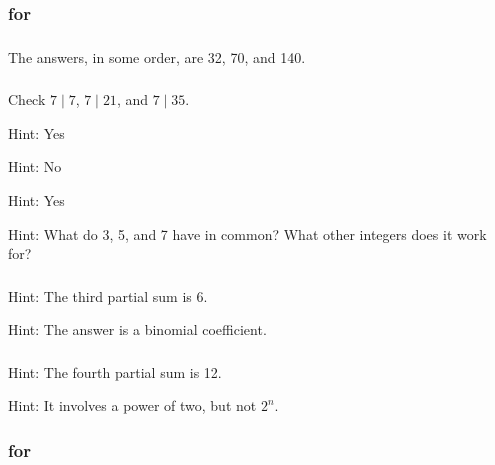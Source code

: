 \subsubsection{\answers for  \subpascalpatterns}

\subsubsection*{ \answers}
The answers, in some order, are 32, 70, and 140.

\subsubsection*{ \answers}
\begin{apart}
    \item Check $7 \mid 7$, $7 \mid 21$, and $7 \mid 35$.
    \item Hint: Yes
    \item Hint: No
    \item Hint: Yes
    \item Hint: What do 3, 5, and 7 have in common?  What other integers does it work for?
\end{apart}

\subsubsection*{ \answers}
\begin{apart}
    \item Hint: The third partial sum is 6.
    \item Hint: The answer is a binomial coefficient. %
\end{apart}

	\subsubsection*{ \answers}
\begin{apart}
    \item Hint: The fourth partial sum is 12.
    \item Hint: It involves a power of two, but not $2^n$.
\end{apart}

\subsubsection{\answers for  \subbinomthm}


